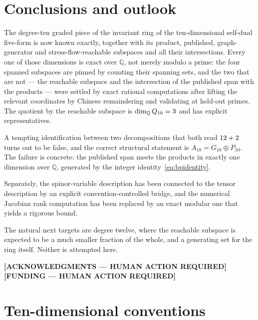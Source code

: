 \documentclass[11pt,a4paper]{article}
\newcommand{\HUMAN}[1]{\textbf{[#1 --- HUMAN ACTION REQUIRED]}}
\begin{document}
\section{Conclusions and outlook}
\label{sec:conclusions}

The degree-ten graded piece of the invariant ring of the ten-dimensional
self-dual five-form is now known exactly, together with its product, published,
graph-generator and stress-flow-reachable subspaces and all their intersections.
Every one of those dimensions is exact over $\mathbb{Q}$, not merely modulo a
prime: the four spanned subspaces are pinned by counting their spanning sets, and
the two that are not --- the reachable subspace and the intersection of the
published span with the products --- were settled by exact rational computations
after lifting the relevant coordinates by Chinese remaindering and validating at
held-out primes. The quotient by the reachable subspace is
$\dim_{\mathbb{Q}} Q_{10} = 3$ and has explicit
representatives.

A tempting identification between two decompositions that both read
$12+2$ turns out to be false, and the correct structural statement
is $A_{10} = G_{10}\oplus P_{10}$. The failure is concrete: the published span
meets the products in exactly one dimension over $\mathbb{Q}$, generated by the
integer identity~\eqref{eq:bpidentity}.

Separately, the spinor-variable description has been connected to the tensor
description by an explicit convention-controlled bridge, and the numerical
Jacobian rank computation has been replaced by an exact modular one that yields a
rigorous bound.

The natural next targets are degree twelve, where the reachable subspace is
expected to be a much smaller fraction of the whole, and a generating set for the
ring itself. Neither is attempted here.

\acknowledgments
\HUMAN{ACKNOWLEDGMENTS}
\HUMAN{FUNDING}

\appendix

\section{Ten-dimensional conventions}
\label{app:conventions}

\end{document}

